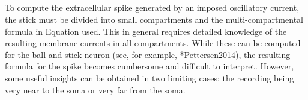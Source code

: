 \subsection{}
\label{sec:Spikes:approximate}
To compute the extracellular spike generated by an imposed oscillatory current,  the stick must be divided into small compartments  and the multi-compartmental formula in Equation  used. This in general requires detailed knowledge of the resulting membrane currents in all compartments. 
While these can be computed for the ball-and-stick neuron (see, for example, \citeasnoun**{Pettersen2014}), 
the resulting formula for the spike becomes cumbersome and difficult to interpret.  However, some useful insights can be obtained in two limiting cases: the recording being very near to the soma or very far from the soma.

%

